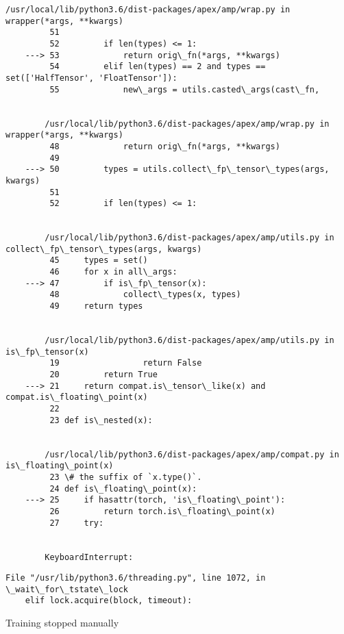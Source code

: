 \documentclass[10pt]{article}
\begin{document}
\begin{Verbatim}[commandchars=\\\{\}]
        /usr/local/lib/python3.6/dist-packages/apex/amp/wrap.py in wrapper(*args, **kwargs)
         51 
         52         if len(types) <= 1:
    ---> 53             return orig\_fn(*args, **kwargs)
         54         elif len(types) == 2 and types == set(['HalfTensor', 'FloatTensor']):
         55             new\_args = utils.casted\_args(cast\_fn,


        /usr/local/lib/python3.6/dist-packages/apex/amp/wrap.py in wrapper(*args, **kwargs)
         48             return orig\_fn(*args, **kwargs)
         49 
    ---> 50         types = utils.collect\_fp\_tensor\_types(args, kwargs)
         51 
         52         if len(types) <= 1:


        /usr/local/lib/python3.6/dist-packages/apex/amp/utils.py in collect\_fp\_tensor\_types(args, kwargs)
         45     types = set()
         46     for x in all\_args:
    ---> 47         if is\_fp\_tensor(x):
         48             collect\_types(x, types)
         49     return types


        /usr/local/lib/python3.6/dist-packages/apex/amp/utils.py in is\_fp\_tensor(x)
         19                 return False
         20         return True
    ---> 21     return compat.is\_tensor\_like(x) and compat.is\_floating\_point(x)
         22 
         23 def is\_nested(x):


        /usr/local/lib/python3.6/dist-packages/apex/amp/compat.py in is\_floating\_point(x)
         23 \# the suffix of `x.type()`.
         24 def is\_floating\_point(x):
    ---> 25     if hasattr(torch, 'is\_floating\_point'):
         26         return torch.is\_floating\_point(x)
         27     try:


        KeyboardInterrupt: 

    \end{Verbatim}

    \begin{Verbatim}[commandchars=\\\{\}]
  File "/usr/lib/python3.6/threading.py", line 1072, in \_wait\_for\_tstate\_lock
    elif lock.acquire(block, timeout):
    \end{Verbatim}

    Training stopped manually
\end{document}
